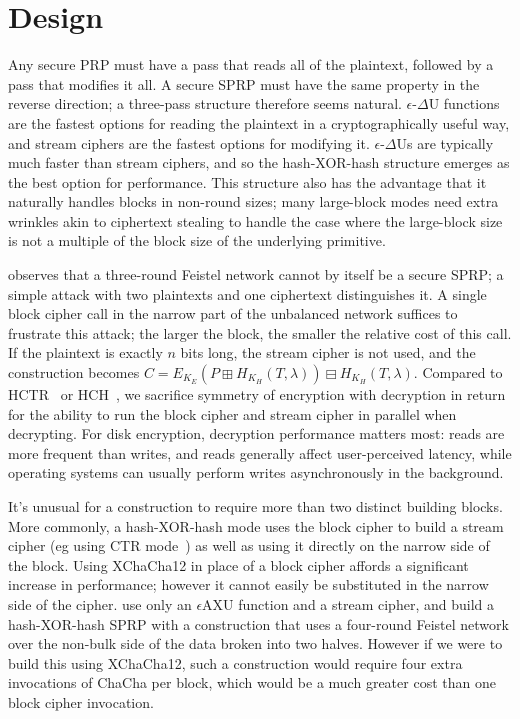 \documentclass[eprint.tex]{subfiles}
\begin{document}
\section{Design}
Any secure PRP must have a pass that reads all of the plaintext, followed by a pass that modifies
it all. A secure SPRP must have the same property in the reverse direction;
a three-pass structure therefore seems natural.
$\epsilon$-$\Delta$U functions are the fastest options for reading the plaintext in a
cryptographically useful way, and stream ciphers are the fastest options for modifying it.
$\epsilon$-$\Delta$Us
are typically much faster than stream ciphers, and so the hash-XOR-hash structure emerges as
the best option for performance. This structure also has the advantage that it naturally handles
blocks in non-round sizes; many large-block modes need extra wrinkles akin to ciphertext stealing
to handle the case where the large-block size is not
a multiple of the block size of the underlying primitive.

\cite{luby-rackoff} observes that a three-round Feistel network cannot by itself be a secure SPRP;
a simple attack with two plaintexts and one ciphertext distinguishes it. A single block cipher call
in the narrow part of the unbalanced network suffices to frustrate this attack; the
larger the block, the smaller the relative cost of this call. If the plaintext is exactly $n$ bits
long, the stream cipher is not used, and the construction becomes
$C = E_{K_E}(P \boxplus H_{K_H}(T, \lambda)) \boxminus H_{K_H}(T, \lambda)$.
Compared to HCTR~\cite{hctr} or HCH~\cite{hch}, we sacrifice
symmetry of encryption with decryption in return for
the ability to run the block cipher and stream cipher in parallel when decrypting.
For disk encryption, decryption performance matters most:
reads are more frequent than writes, and reads generally affect user-perceived latency, while
operating systems can usually perform writes asynchronously in the background.

It's unusual for a construction to require more than two distinct building blocks.
More commonly, a hash-XOR-hash mode uses the block cipher to build a stream cipher
(eg using CTR mode~\cite{ctr})
as well as using it directly on the narrow side of the block.
Using XChaCha12 in place of a block cipher affords a significant increase in performance;
however it cannot easily be substituted in the narrow side of the cipher.
\cite{sarkar1,sarkar2,sarkar3,sarkar4} use only an $\epsilon$AXU function
and a stream cipher, and build a hash-XOR-hash SPRP
with a construction that uses a four-round Feistel network over the non-bulk side of the data
broken into two halves. However if we were to build this using XChaCha12,
such a construction would require four extra invocations of ChaCha per block, which would be
a much greater cost than one block cipher invocation.
\end{document}
